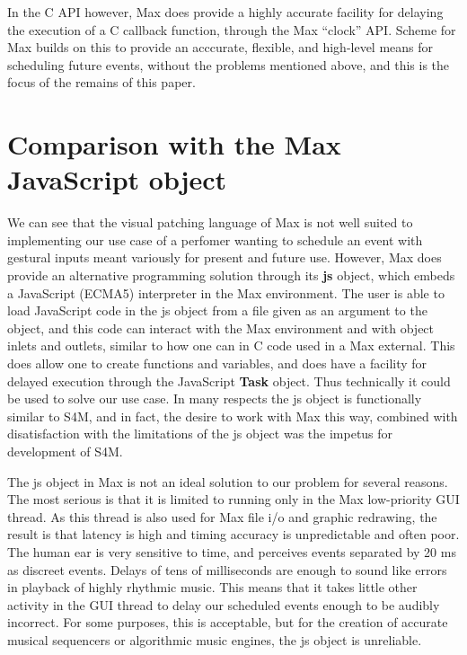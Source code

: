 \documentclass[acmsmall]{acmart}
\begin{document}
In the C API however, Max does provide a highly accurate facility for delaying
the execution of a C callback function, through the Max ``clock'' API. Scheme
for Max builds on this to provide an acccurate, flexible, and high-level means 
for scheduling future events, without the problems mentioned above, and this 
is the focus of the remains of this paper.


\section{Comparison with the Max JavaScript object}

We can see that the visual patching language of Max is not well suited to implementing
our use case of a perfomer wanting to schedule an event with gestural inputs meant
variously for present and future use. 
However, Max does provide an alternative programming solution through its
\textbf{js} object, which embeds a JavaScript (ECMA5) interpreter in the Max environment.
The user is able to load JavaScript code in the js object from a file given as an argument to the object,
and this code can interact with the Max environment and with object inlets and outlets,
similar to how one can in C code used in a Max external.
This does allow one to create functions and variables, and does have a facility
for delayed execution through the JavaScript \textbf{Task} object. 
Thus technically it could be used to solve our use case.
In many respects the js object is functionally similar to S4M, and in fact, the desire to 
work with Max this way, combined with disatisfaction with the limitations of the js
object was the impetus for development of S4M.

The js object in Max is not an ideal solution to our problem for several reasons. 
The most serious
is that it is limited to running only in the Max low-priority GUI thread. As this
thread is also used for Max file i/o and graphic redrawing, the result is that latency
is high and timing accuracy is unpredictable and often poor.
The human ear is very sensitive to time, and perceives events separated by 20 ms as discreet
events. 
Delays of tens of milliseconds are enough to sound like errors in playback
of highly rhythmic music. This means that it takes little other activity in the
GUI thread to delay our scheduled events enough to be audibly incorrect. 
For some purposes, this is acceptable, but for the creation of accurate 
musical sequencers or algorithmic music engines, the js object is unreliable. 
\end{document}
